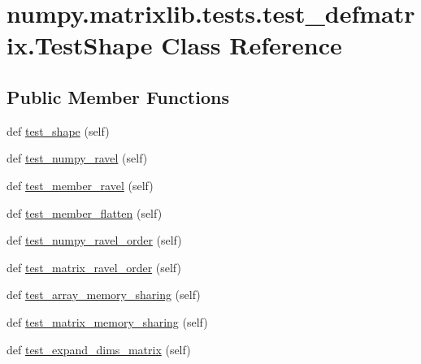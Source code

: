 \hypertarget{classnumpy_1_1matrixlib_1_1tests_1_1test__defmatrix_1_1TestShape}{}\section{numpy.\+matrixlib.\+tests.\+test\+\_\+defmatrix.\+Test\+Shape Class Reference}
\label{classnumpy_1_1matrixlib_1_1tests_1_1test__defmatrix_1_1TestShape}
\subsection*{Public Member Functions}
\begin{DoxyCompactItemize}
\item 
def \hyperlink{classnumpy_1_1matrixlib_1_1tests_1_1test__defmatrix_1_1TestShape_a8ab523326b4b1b3c5aa5882c456f1726}{test\+\_\+shape} (self)
\item 
def \hyperlink{classnumpy_1_1matrixlib_1_1tests_1_1test__defmatrix_1_1TestShape_a6e766e956af16f5a984025ac1d240f8e}{test\+\_\+numpy\+\_\+ravel} (self)
\item 
def \hyperlink{classnumpy_1_1matrixlib_1_1tests_1_1test__defmatrix_1_1TestShape_a0a723867f87417f06d998f9f5d105baf}{test\+\_\+member\+\_\+ravel} (self)
\item 
def \hyperlink{classnumpy_1_1matrixlib_1_1tests_1_1test__defmatrix_1_1TestShape_a6d47c0c1c5d1cbe9f9205c54893f1e18}{test\+\_\+member\+\_\+flatten} (self)
\item 
def \hyperlink{classnumpy_1_1matrixlib_1_1tests_1_1test__defmatrix_1_1TestShape_a9abcbe209ac06a0604cf89b3632d2d96}{test\+\_\+numpy\+\_\+ravel\+\_\+order} (self)
\item 
def \hyperlink{classnumpy_1_1matrixlib_1_1tests_1_1test__defmatrix_1_1TestShape_a6cf5a3fa4b4e162cae537fa7196992a8}{test\+\_\+matrix\+\_\+ravel\+\_\+order} (self)
\item 
def \hyperlink{classnumpy_1_1matrixlib_1_1tests_1_1test__defmatrix_1_1TestShape_a8f440ecb4181c10d4c6a7c139dd925e9}{test\+\_\+array\+\_\+memory\+\_\+sharing} (self)
\item 
def \hyperlink{classnumpy_1_1matrixlib_1_1tests_1_1test__defmatrix_1_1TestShape_af1f5d1b179da856aa597d3d8947d6176}{test\+\_\+matrix\+\_\+memory\+\_\+sharing} (self)
\item 
def \hyperlink{classnumpy_1_1matrixlib_1_1tests_1_1test__defmatrix_1_1TestShape_a8f533b81eb5cdf40ed38ad4ea686a50d}{test\+\_\+expand\+\_\+dims\+\_\+matrix} (self)
\end{DoxyCompactItemize}
